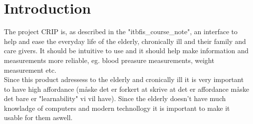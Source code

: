 \chapter{Introduction}
The project CRIP is, as described in the "itbfis\_course\_note", an interface to help and ease the everyday life of the elderly, chronically ill and their family and care givers. It should be intuitive to use and it should help make information and measurements more reliable, eg. blood preasure measurements, weight measurement  etc. \\
Since this product adressess to the elderly and cronically ill it is very important to have high affordance (måske det er forkert at skrive at det er affordance måske det bare er "learnability" vi vil have). Since the elderly doesn't have much knowladge of computers and modern technollogy it is important to make it usable for them aswell.